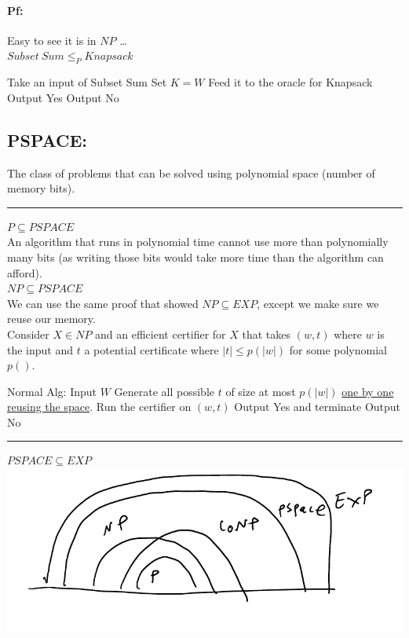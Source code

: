 \documentclass[12 pt]{article}
\begin{document}
          \paragraph{Pf:} Easy to see it is in $NP$ \ldots
          \\ $Subset \ Sum \leq_P Knapsack$
          \begin{algorithmic}
            \State Take an input of Subset Sum
            \State Set $K=W$
            \State Feed it to the oracle for Knapsack
             Output Yes
             Output No
            \EndIf
          \end{algorithmic}
          \subsection{PSPACE:}
          The class of problems that can be solved using polynomial
          space (number of memory bits).
          \\ \noindent \rule{\textwidth}{0.5pt}
          $P \subseteq PSPACE$
          \\ An algorithm that runs in polynomial time cannot use more
          than polynomially many bits (as writing those bits would
          take more time than the algorithm can afford).
          \\ $NP \subseteq PSPACE$
          \\ We can use the same proof that showed $NP \subseteq EXP$,
          except we make sure we reuse our memory.
          \\ Consider $X \in NP$ and an efficient certifier for $X$
          that takes $(w,t)$ where $w$ is the input and $t$ a
          potential certificate where $|t| \leq p(|w|)$ for some
          polynomial $p()$.
          \begin{algorithmic}
            \State Normal Alg:
            \State Input $W$
            \State Generate all possible $t$ of size at most $p(|w|)$
            \underline{one by one reusing the space}.
            \State Run the certifier on $(w,t)$
             Output Yes and terminate
             Output No
            \EndIf
          \end{algorithmic}
          \noindent \rule{\textwidth}{0.5pt}
          $PSPACE \subseteq EXP$
          \\\includegraphics[width=.9\textwidth]{i144}
\end{document}
